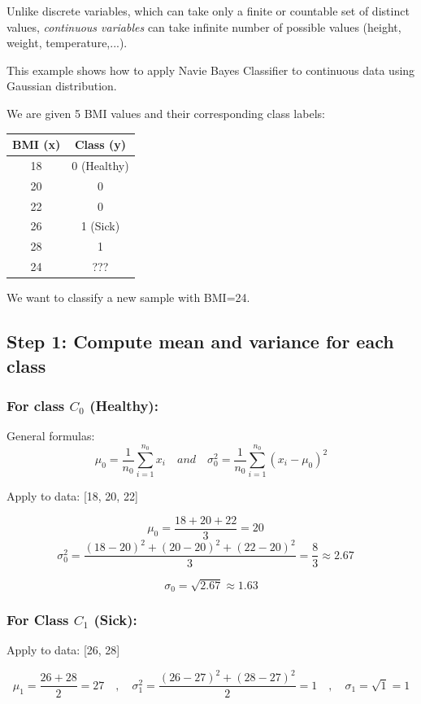 \documentclass{article}
\begin{document}
Unlike discrete variables, which can take only a finite or countable set of distinct values, \textit{continuous variables} can take infinite number of possible values (height, weight, temperature,...).

This example shows how to apply Navie Bayes Classifier to continuous data using Gaussian distribution.

We are given 5 BMI values and their corresponding class labels:

\begin{center}
\begin{tabular}{|c|c|}
\hline
BMI (x) & Class (y) \\
\hline
18 & 0 (Healthy) \\
20 & 0 \\
22 & 0 \\
26 & 1 (Sick) \\
28 & 1 \\
24 & ??? \\
\hline
\end{tabular}
\end{center}

We want to classify a new sample with BMI=24.

\subsection*{Step 1: Compute mean and variance for each class}
\subsubsection*{For class $C_0$ (Healthy):}

General formulas:
$$
\mu _0 = \frac{1}{n_0} \sum_{i=1}^{n_0} x_i
\quad  and \quad
\sigma_0^2 = \frac{1}{n_0} \sum_{i=1}^{n_0} (x_i - \mu  _0)^2
$$

Apply to data: [18, 20, 22]

$$
\mu_0 = \frac{18 + 20 + 22}{3} = 20
\quad
$$
$$
\sigma _0^2 = \frac{(18 - 20)^2 + (20 - 20)^2 + (22 - 20)^2}{3} = \frac{8}{3} \approx 2.67
\quad
$$


$$
\sigma_0 = \sqrt{2.67} \approx 1.63
$$

\subsubsection*{For Class $ C_1 $ (Sick):}
Apply to data: [26, 28]

$$
\mu _1 = \frac{26 + 28}{2} = 27
\quad , \quad
\sigma _1^2 = \frac{(26 - 27)^2 + (28 - 27)^2}{2} = 1
\quad , \quad
\sigma _1 = \sqrt{1} = 1
$$
\end{document}
